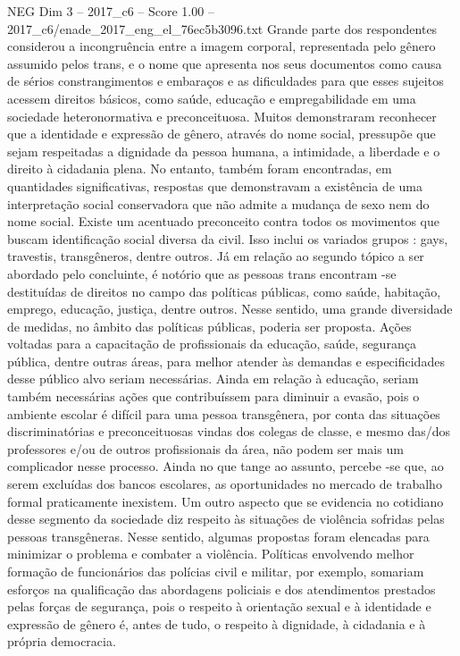 \begin{textsample}{NEG Dim 3 – 2017\_c6 – Score 1.00 – 2017\_c6/enade\_2017\_eng\_el\_76ec5b3096.txt}
Grande parte dos respondentes considerou a incongruência entre a imagem corporal, representada pelo gênero assumido pelos trans, e o nome que apresenta nos seus documentos como causa de sérios constrangimentos e embaraços e as dificuldades para que esses sujeitos acessem direitos básicos, como saúde, educação e empregabilidade em uma sociedade heteronormativa e preconceituosa.
Muitos demonstraram reconhecer que a identidade e expressão de gênero, através do nome social, pressupõe que sejam respeitadas a dignidade da pessoa humana, a intimidade, a liberdade e o direito à cidadania plena.
No entanto, também foram encontradas, em quantidades significativas, respostas que demonstravam a existência de uma interpretação social conservadora que não admite a mudança de sexo nem do nome social.
Existe um acentuado preconceito contra todos os movimentos que buscam identificação social diversa da civil.
Isso inclui os variados grupos : gays, travestis, transgêneros, dentre outros.
Já em relação ao segundo tópico a ser abordado pelo concluinte, é notório que as pessoas trans encontram -se destituídas de direitos no campo das políticas públicas, como saúde, habitação, emprego, educação, justiça, dentre outros.
Nesse sentido, uma grande diversidade de medidas, no âmbito das políticas públicas, poderia ser proposta.
Ações voltadas para a capacitação de profissionais da educação, saúde, segurança pública, dentre outras áreas, para melhor atender às demandas e especificidades desse público alvo seriam necessárias.
Ainda em relação à educação, seriam também necessárias ações que contribuíssem para diminuir a evasão, pois o ambiente escolar é difícil para uma pessoa transgênera, por conta das situações discriminatórias e preconceituosas vindas dos colegas de classe, e mesmo das/dos professores e/ou de outros profissionais da área, não podem ser mais um complicador nesse processo.
Ainda no que tange ao assunto, percebe -se que, ao serem excluídas dos bancos escolares, as oportunidades no mercado de trabalho formal praticamente inexistem.
Um outro aspecto que se evidencia no cotidiano desse segmento da sociedade diz respeito às situações de violência sofridas pelas pessoas transgêneras.
Nesse sentido, algumas propostas foram elencadas para minimizar o problema e combater a violência.
Políticas envolvendo melhor formação de funcionários das polícias civil e militar, por exemplo, somariam esforços na qualificação das abordagens policiais e dos atendimentos prestados pelas forças de segurança, pois o respeito à orientação sexual e à identidade e expressão de gênero é, antes de tudo, o respeito à dignidade, à cidadania e à própria democracia.

\end{textsample}
